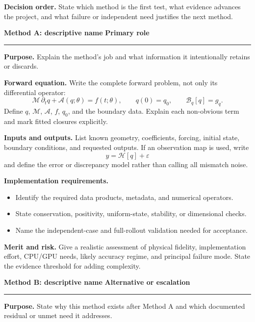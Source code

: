 \documentclass[10pt]{article}
\newcommand{\MethodTitle}[2]{%
  {\Large\bfseries\color{routeblue}#1}\hfill
  {\normalsize\bfseries\color{routegray}#2}\par\vspace{2pt}
  \hrule\vspace{5pt}}
\begin{document}
\textbf{Decision order.} State which method is the first test, what evidence advances the project, and what failure or independent need justifies the next method.

\clearpage
\MethodTitle{Method A: descriptive name}{Primary role}

\textbf{Purpose.} Explain the method's job and what information it intentionally retains or discards.

\textbf{Forward equation.} Write the complete forward problem, not only its differential operator:
\begin{equation}
 \boxed{\mathcal M\,\partial_t q+\mathcal A(q;\theta)=f(t;\theta),
 \qquad q(0)=q_0,\qquad \mathcal B_q[q]=g_q.}
 \label{eq:method-a}
\end{equation}
Define $q$, $\mathcal M$, $\mathcal A$, $f$, $q_0$, and the boundary data. Explain each non-obvious term and mark fitted closures explicitly.

\textbf{Inputs and outputs.} List known geometry, coefficients, forcing, initial state, boundary conditions, and requested outputs. If an observation map is used, write
\begin{equation}
 y=\mathcal H[q]+\varepsilon
\end{equation}
and define the error or discrepancy model rather than calling all mismatch noise.

\textbf{Implementation requirements.}
\begin{itemize}
 \item Identify the required data products, metadata, and numerical operators.
 \item State conservation, positivity, uniform-state, stability, or dimensional checks.
 \item Name the independent-case and full-rollout validation needed for acceptance.
\end{itemize}

\textbf{Merit and risk.} Give a realistic assessment of physical fidelity, implementation effort, CPU/GPU needs, likely accuracy regime, and principal failure mode. State the evidence threshold for adding complexity.

\clearpage
\MethodTitle{Method B: descriptive name}{Alternative or escalation}

\textbf{Purpose.} State why this method exists after Method A and which documented residual or unmet need it addresses.
\end{document}
